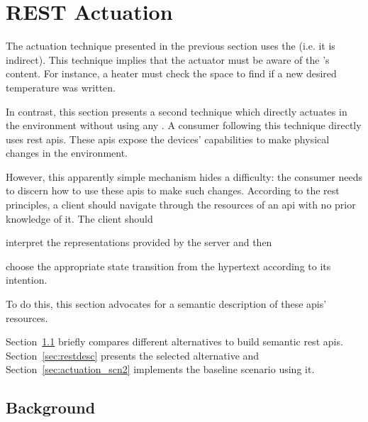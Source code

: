 \section{REST Actuation}
\label{sec:direct_actuation}


The actuation technique presented in the previous section uses the \Space{} (i.e. it is indirect).
This technique implies that the actuator must be aware of the \Space{}'s content.
For instance, a heater must check the space to find if a new desired temperature was written.


In contrast, this section presents a second technique which directly actuates in the environment without using any \Space{}.
A consumer following this technique directly uses \ac{rest} \acp{api}. %
These \acp{api} expose the devices' capabilities to make physical changes in the environment.

However, this apparently simple mechanism hides a difficulty: the consumer needs to discern how to use these \acp{api} to make such changes.
According to the \ac{rest} principles, a client should navigate through the resources of an \ac{api} with no prior knowledge of it.
The client should 
\begin{enumerate*}[label=\itshape(\arabic*\upshape)]
  \item interpret the representations provided by the server and then
  \item choose the appropriate state transition from the hypertext according to its intention. %
\end{enumerate*}
To do this, this section advocates for a semantic description of these \acp{api}' resources.

Section~\ref{sec:actuation_rest_background} briefly compares different alternatives to build semantic \ac{rest} \acp{api}.
Section~\ref{sec:restdesc} presents the selected alternative and Section~\ref{sec:actuation_scn2} implements the baseline scenario using it.



\subsection{Background}
\label{sec:actuation_rest_background}

